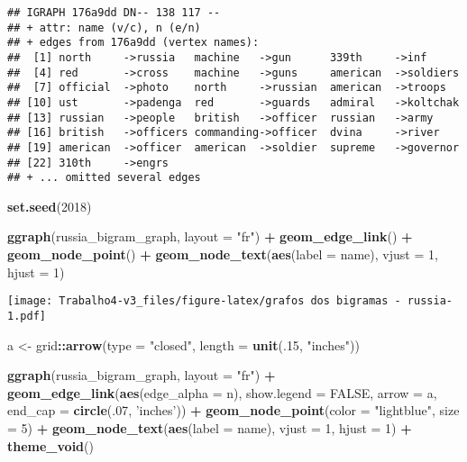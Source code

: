 \documentclass[]{article}
\newenvironment{Shaded}{\begin{snugshade}}{\end{snugshade}}
\newcommand{\DataTypeTok}[1]{\textcolor[rgb]{0.13,0.29,0.53}{#1}}
\newcommand{\DecValTok}[1]{\textcolor[rgb]{0.00,0.00,0.81}{#1}}
\newcommand{\KeywordTok}[1]{\textcolor[rgb]{0.13,0.29,0.53}{\textbf{#1}}}
\newcommand{\NormalTok}[1]{#1}
\newcommand{\OperatorTok}[1]{\textcolor[rgb]{0.81,0.36,0.00}{\textbf{#1}}}
\newcommand{\OtherTok}[1]{\textcolor[rgb]{0.56,0.35,0.01}{#1}}
\newcommand{\StringTok}[1]{\textcolor[rgb]{0.31,0.60,0.02}{#1}}
\begin{document}
\begin{verbatim}
## IGRAPH 176a9dd DN-- 138 117 -- 
## + attr: name (v/c), n (e/n)
## + edges from 176a9dd (vertex names):
##  [1] north     ->russia   machine   ->gun      339th     ->inf     
##  [4] red       ->cross    machine   ->guns     american  ->soldiers
##  [7] official  ->photo    north     ->russian  american  ->troops  
## [10] ust       ->padenga  red       ->guards   admiral   ->koltchak
## [13] russian   ->people   british   ->officer  russian   ->army    
## [16] british   ->officers commanding->officer  dvina     ->river   
## [19] american  ->officer  american  ->soldier  supreme   ->governor
## [22] 310th     ->engrs   
## + ... omitted several edges
\end{verbatim}

\begin{Shaded}
\begin{Highlighting}[]
\KeywordTok{set.seed}\NormalTok{(}\DecValTok{2018}\NormalTok{)}

\KeywordTok{ggraph}\NormalTok{(russia_bigram_graph, }\DataTypeTok{layout =} \StringTok{"fr"}\NormalTok{) }\OperatorTok{+}
\StringTok{  }\KeywordTok{geom_edge_link}\NormalTok{() }\OperatorTok{+}
\StringTok{  }\KeywordTok{geom_node_point}\NormalTok{() }\OperatorTok{+}
\StringTok{  }\KeywordTok{geom_node_text}\NormalTok{(}\KeywordTok{aes}\NormalTok{(}\DataTypeTok{label =}\NormalTok{ name), }\DataTypeTok{vjust =} \DecValTok{1}\NormalTok{, }\DataTypeTok{hjust =} \DecValTok{1}\NormalTok{)}
\end{Highlighting}
\end{Shaded}

\texttt{[image: Trabalho4-v3\_files/figure-latex/grafos dos bigramas - russia-1.pdf]}

\begin{Shaded}
\begin{Highlighting}[]
\NormalTok{a <-}\StringTok{ }\NormalTok{grid}\OperatorTok{::}\KeywordTok{arrow}\NormalTok{(}\DataTypeTok{type =} \StringTok{"closed"}\NormalTok{, }\DataTypeTok{length =} \KeywordTok{unit}\NormalTok{(.}\DecValTok{15}\NormalTok{, }\StringTok{"inches"}\NormalTok{))}

\KeywordTok{ggraph}\NormalTok{(russia_bigram_graph, }\DataTypeTok{layout =} \StringTok{"fr"}\NormalTok{) }\OperatorTok{+}
\StringTok{  }\KeywordTok{geom_edge_link}\NormalTok{(}\KeywordTok{aes}\NormalTok{(}\DataTypeTok{edge_alpha =}\NormalTok{ n), }\DataTypeTok{show.legend =} \OtherTok{FALSE}\NormalTok{,}
                 \DataTypeTok{arrow =}\NormalTok{ a, }\DataTypeTok{end_cap =} \KeywordTok{circle}\NormalTok{(.}\DecValTok{07}\NormalTok{, }\StringTok{'inches'}\NormalTok{)) }\OperatorTok{+}
\StringTok{  }\KeywordTok{geom_node_point}\NormalTok{(}\DataTypeTok{color =} \StringTok{"lightblue"}\NormalTok{, }\DataTypeTok{size =} \DecValTok{5}\NormalTok{) }\OperatorTok{+}
\StringTok{  }\KeywordTok{geom_node_text}\NormalTok{(}\KeywordTok{aes}\NormalTok{(}\DataTypeTok{label =}\NormalTok{ name), }\DataTypeTok{vjust =} \DecValTok{1}\NormalTok{, }\DataTypeTok{hjust =} \DecValTok{1}\NormalTok{) }\OperatorTok{+}
\StringTok{  }\KeywordTok{theme_void}\NormalTok{()}
\end{Highlighting}
\end{Shaded}
\end{document}
